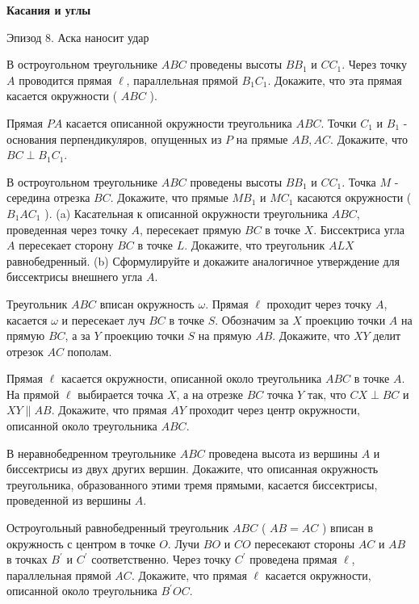 \centerline{\bf \Huge Касания и углы}

\begin{flushright}
        \scriptsize{Эпизод 8. Аска наносит удар}
\end{flushright}

В остроугольном треугольнике $A B C$ проведены высоты $B B_1$ и $C C_1$. Через точку $A$ проводится прямая $\ell$, параллельная прямой $B_1 C_1$. Докажите, что эта прямая касается окружности ( $A B C$ ).

Прямая $P A$ касается описанной окружности треугольника $A B C$. Точки $C_1$ и $B_1$ - основания перпендикуляров, опущенных из $P$ на прямые $A B, A C$. Докажите, что $B C \perp B_1 C_1$.

В остроугольном треугольнике $A B C$ проведены высоты $B B_1$ и $C C_1$. Точка $M$ - середина отрезка $B C$. Докажите, что прямые $M B_1$ и $M C_1$ касаются окружности ( $B_1 A C_1$ ).
(a) Касательная к описанной окружности треугольника $A B C$, проведенная через точку $A$, пересекает прямую $B C$ в точке $X$. Биссектриса угла $A$ пересекает сторону $B C$ в точке $L$. Докажите, что треугольник $A L X$ равнобедренный. (b) Сформулируйте и докажите аналогичное утверждение для биссектрисы внешнего угла $A$.

Треугольник $A B C$ вписан окружность $\omega$. Прямая $\ell$ проходит через точку $A$, касается $\omega$ и пересекает луч $B C$ в точке $S$. Обозначим за $X$ проекцию точки $A$ на прямую $B C$, а за $Y$ проекцию точки $S$ на прямую $A B$. Докажите, что $X Y$ делит отрезок $A C$ пополам.

Прямая $\ell$ касается окружности, описанной около треугольника $A B C$ в точке $A$. На прямой $\ell$ выбирается точка $X$, а на отрезке $B C$ точка $Y$ так, что $C X \perp B C$ и $X Y \| A B$. Докажите, что прямая $A Y$ проходит через центр окружности, описанной около треугольника $A B C$.

В неравнобедренном треугольнике $A B C$ проведена высота из вершины $A$ и биссектрисы из двух других вершин. Докажите, что описанная окружность треугольника, образованного этими тремя прямыми, касается биссектрисы, проведенной из вершины $A$.

Остроугольный равнобедренный треугольник $A B C$ ( $A B=A C$ ) вписан в окружность с центром в точке $O$. Лучи $B O$ и $C O$ пересекают стороны $A C$ и $A B$ в точках $B^{\prime}$ и $C^{\prime}$ соответственно. Через точку $C^{\prime}$ проведена прямая $\ell$, параллельная прямой $A C$. Докажите, что прямая $\ell$ касается окружности, описанной около треугольника $B^{\prime} O C$.